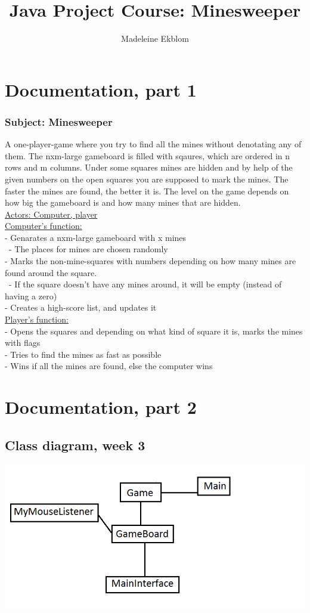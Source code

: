 \documentclass[12pt,twoside,a4paper]{article}
\title{Java Project Course: Minesweeper}
\author{Madeleine Ekblom}
\begin{document}
\maketitle
\section{Documentation, part 1}

\subsubsection*{Subject: Minesweeper}
A one-player-game where you try to find all the mines without denotating any of them. The nxm-large gameboard 
is filled with sqaures, which are ordered in n rows and m columns. Under some squares mines are hidden and by 
help of the given numbers on the open squares you are supposed to mark the mines. The faster the mines are found, 
the better it is. The level on the game depends on how big the gameboard is and how many mines that are hidden.  \\

\underline{Actors: Computer, player} \\ 

\underline{Computer's function:} \\
	- Genarates a nxm-large gameboard with x mines \\
	\ 	- The places for mines are chosen randomly \\
	- Marks the non-mine-squares with numbers depending on how many mines are found around the square. \\
	  \ - If the square doesn't have any mines around, it will be empty (instead of having a zero) \\
	- Creates a high-score list, and updates it  \\

\underline{Player's function:} \\
	- Opens the squares and depending on what kind of square it is, marks the mines with flags \\
	- Tries to find the mines as fast as possible \\ 
	- Wins if all the mines are found, else the computer wins \\

\section{Documentation, part 2}

\subsection{Class diagram, week 3}
\includegraphics{classdiagram.png}
\end{document}
